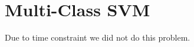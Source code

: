 
\section{Multi-Class SVM}\label{sec:multi_class_svm}

Due to time constraint we did not do this problem.